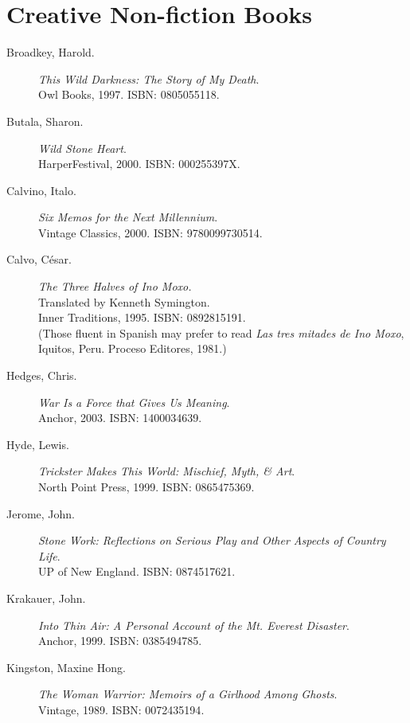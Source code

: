 \documentclass[letterpaper,oneside]{memoir}
\begin{document}
\section{Creative Non-fiction Books}
\begin{description}
\item [Broadkey, Harold.] \textit{This Wild Darkness: The Story of My Death}. \\Owl Books, 1997. \textsc{ISBN: 0805055118}.

\item [Butala, Sharon.] \textit{Wild Stone Heart}. \\HarperFestival,
  2000. \textsc{ISBN: 000255397X}.

\item [Calvino, Italo.] \textit{Six Memos for the Next Millennium}.
  \\Vintage Classics, 2000.  \textsc{ISBN: 9780099730514}.

\item [Calvo, C\'esar.] \textit{The Three Halves of Ino Moxo.} \\Translated by Kenneth Symington. \\Inner Traditions, 1995. \textsc{ISBN: 0892815191}.\\(Those fluent in Spanish may prefer to read \textit{Las tres mitades de Ino Moxo}, Iquitos, Peru. Proceso Editores, 1981.)

\item [Hedges, Chris.] \textit{War Is a Force that Gives Us Meaning}. \\Anchor, 2003. \textsc{ISBN: 1400034639}.

\item [Hyde, Lewis.] \textit{Trickster Makes This World: Mischief, Myth, \& Art}. \\North Point Press, 1999. \textsc{ISBN: 0865475369}.

\item [Jerome, John.] \textit{Stone Work: Reflections on Serious Play and Other Aspects of Country Life}. \\UP of New England. \textsc{ISBN: 0874517621}.

\item [Krakauer, John.] \textit{Into Thin Air: A Personal Account of the Mt. Everest Disaster}. \\Anchor, 1999. \textsc{ISBN: 0385494785}.

\item [Kingston, Maxine Hong.] \textit{The Woman Warrior: Memoirs of a
    Girlhood Among Ghosts}. \\Vintage, 1989. \textsc{ISBN:
    0072435194}.


\end{description}
\end{document}
